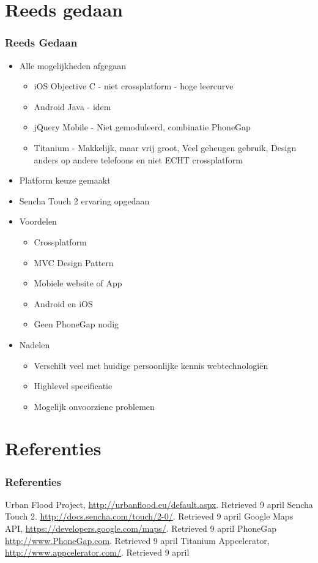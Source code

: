 \documentclass[10pt,a4paper]{beamer}
\begin{document}
\section{Reeds gedaan}
\begin{frame}
\frametitle{Reeds Gedaan}
\begin{itemize}
\item Alle mogelijkheden afgegaan
\begin{itemize}
\item iOS Objective C - niet crossplatform - hoge leercurve
\item Android Java - idem
\item jQuery Mobile - Niet gemoduleerd, combinatie PhoneGap
\item Titanium - Makkelijk, maar vrij groot, Veel geheugen gebruik, Design anders op andere telefoons en niet ECHT crossplatform
\end{itemize}
\item Platform keuze gemaakt
\item Sencha Touch 2 ervaring opgedaan
\item Voordelen
\begin{itemize}
\item Crossplatform
\item MVC Design Pattern
\item Mobiele website of App
\item Android en iOS
\item Geen PhoneGap nodig
\end{itemize}
\item Nadelen
\begin{itemize}
\item Verschilt veel met huidige persoonlijke kennis webtechnologiën
\item Highlevel specificatie
\item Mogelijk onvoorziene problemen
\end{itemize}
\end{itemize}
\end{frame}
\section{Referenties}
\begin{frame}
\begin{thebibliography}{9}
\frametitle{Referenties}
  Urban Flood Project,
  \url{http://urbanflood.eu/default.aspx}.
  Retrieved 9 april
	Sencha Touch 2.
	\url{http://docs.sencha.com/touch/2-0/}.
	Retrieved 9 april
	Google Maps API,
	\url{https://developers.google.com/maps/}.
	Retrieved 9 april
	PhoneGap
	\url{http://www.PhoneGap.com}.
	Retrieved 9 april
	Titanium Appcelerator,
	\url{http://www.appcelerator.com/}.
	Retrieved 9 april
\end{thebibliography}
\end{frame}
\end{document}
